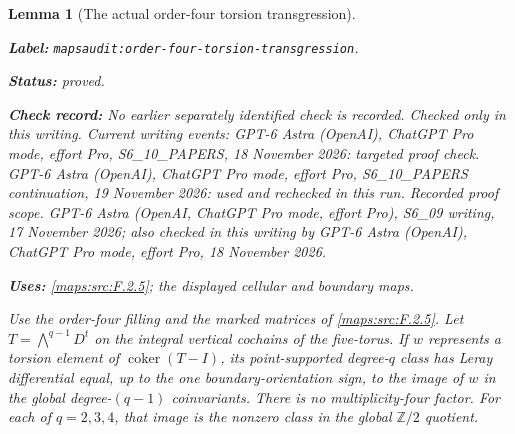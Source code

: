 \documentclass[11pt,a4paper]{article}
\newtheorem{lemma}[lemma]{Lemma}
\theoremstyle{definition}
\newcommand{\StatementRecord}[4]{\par\smallskip\begingroup\upshape\raggedright\noindent\textbf{Label:} \nolinkurl{#1}.\par\noindent\textbf{Status:} #2.\par\noindent\textbf{Check record:} #3.\par\noindent\textbf{Uses:} #4.\par\endgroup\smallskip}
\begin{document}
\begin{lemma}[The actual order-four torsion transgression]
\label{mapsaudit:order-four-torsion-transgression}
\StatementRecord{mapsaudit:order-four-torsion-transgression}{proved}{No earlier separately identified check is recorded. Checked only in this writing. Current writing events: GPT-6 Astra (OpenAI), ChatGPT Pro mode, effort Pro, S6\_10\_PAPERS, 18 November 2026: targeted proof check. GPT-6 Astra (OpenAI), ChatGPT Pro mode, effort Pro, S6\_10\_PAPERS continuation, 19 November 2026: used and rechecked in this run. \emph{Recorded proof scope.} GPT-6 Astra (OpenAI, ChatGPT Pro mode, effort Pro), S6\_09 writing, 17 November 2026; also checked in this writing by GPT-6 Astra (OpenAI), ChatGPT Pro mode, effort Pro, 18 November 2026}{\cref{maps:src:F.2.5}; the displayed cellular and boundary maps}

Use the order-four filling and the marked matrices of \cref{maps:src:F.2.5}.
Let $T=\bigwedge^{q-1}D^t$ on the integral vertical cochains of the
five-torus. If $w$ represents a torsion element of
$\operatorname{coker}(T-I)$, its point-supported degree-$q$ class has
Leray differential equal, up to the one boundary-orientation sign, to
the image of $w$ in the global degree-$(q-1)$ coinvariants. There is
no multiplicity-four factor. For each of $q=2,3,4$, that image is
the nonzero class in the global $\mathbb Z/2$ quotient.
\end{lemma}
\end{document}
